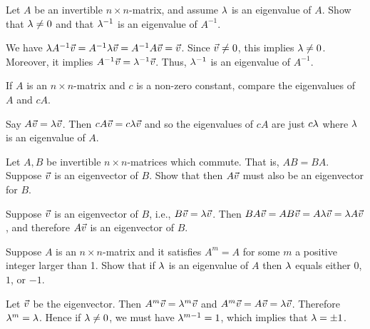 \documentclass{ximera}
\begin{document}
\begin{exercise}
  Let $A$ be an invertible $n\times n$-matrix, and assume $\lambda$
  is an eigenvalue of $A$. Show that $\lambda\neq 0$ and that
  $\lambda^{-1}$ is an eigenvalue of $A^{-1}$.
  \begin{solution}
    We have
    $\lambda A^{-1}\vec{v} = A^{-1}\lambda\vec{v} =
    A^{-1}A\vec{v} = \vec{v}$. Since $\vec{v}\neq 0$, this implies
    $\lambda\neq 0$. Moreover, it implies
    $A^{-1}\vec{v} = \lambda^{-1}\vec{v}$. Thus, $\lambda^{-1}$
    is an eigenvalue of $A^{-1}$.
  \end{solution}
\end{exercise}

\begin{exercise}
  If $A$ is an $n\times n$-matrix and $c$ is a non-zero constant,
  compare the eigenvalues of $A$ and $cA$.
  \begin{solution}
    Say $A\vec{v}=\lambda \vec{v}$. Then
    $cA\vec{v}=c\lambda \vec{v}$ and so the eigenvalues of $cA$ are
    just $c\lambda$ where $\lambda$ is an eigenvalue of $A$.
  \end{solution}
\end{exercise}

\begin{exercise}
  Let $A,B$ be invertible $n\times n$-matrices which commute. That is,
  $AB=BA$. Suppose $\vec{v}$ is an eigenvector of $B$. Show that then
  $A\vec{v}$ must also be an eigenvector for $B$.
  \begin{solution}
    Suppose $\vec{v}$ is an eigenvector of $B$, i.e.,
    $B\vec{v}=\lambda \vec{v}$. Then
    $BA\vec{v}=AB\vec{v} =A\lambda \vec{v}=\lambda A\vec{v}$,
    and therefore $A\vec{v}$ is an eigenvector of $B$.
  \end{solution}
\end{exercise}

\begin{exercise}
  Suppose $A$ is an $n\times n$-matrix and it satisfies $A^m=A$ for
  some $m$ a positive integer larger than 1. Show that if $\lambda$
  is an eigenvalue of $A$ then $\lambda$ equals either $0$, $1$, or
  $-1$.
  \begin{solution}
    Let $\vec{v}$ be the eigenvector. Then
    $A^m\vec{v}=\lambda^m\vec{v}$ and
    $A^m\vec{v}=A\vec{v}=\lambda\vec{v}$. Therefore
    $\lambda^m=\lambda$. Hence if $\lambda \neq 0$, we must
    have $\lambda^{m-1}=1$, which implies that $\lambda=\pm 1$.
  \end{solution}
\end{exercise}
\end{document}
